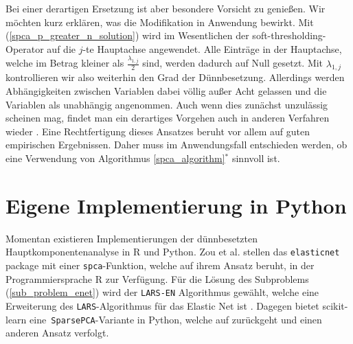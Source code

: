 Bei einer derartigen Ersetzung ist aber besondere Vorsicht zu genießen. Wir möchten kurz erklären, was die Modifikation in Anwendung bewirkt. Mit (\ref{spca_p_greater_n_solution}) wird im Wesentlichen der soft-thresholding-Operator auf die $j$-te Hauptachse angewendet. Alle Einträge in der Hauptachse, welche im Betrag kleiner als $\frac{\lambda_{1,j}}{2}$ sind, werden dadurch auf Null gesetzt. Mit $\lambda_{1,j}$ kontrollieren wir also weiterhin den Grad der Dünnbesetzung. Allerdings werden Abhängigkeiten zwischen Variablen dabei völlig außer Acht gelassen und die Variablen als unabhängig angenommen. Auch wenn dies zunächst unzulässig scheinen mag, findet man ein derartiges Vorgehen auch in anderen Verfahren wieder \cite{tibshirani_diagnosis}. Eine Rechtfertigung dieses Ansatzes beruht vor allem auf guten empirischen Ergebnissen. Daher muss im Anwendungsfall entschieden werden, ob eine Verwendung von Algorithmus \ref{spca_algorithm}$^*$ sinnvoll ist.




\section{Eigene Implementierung in Python}

Momentan existieren Implementierungen der dünnbesetzten Hauptkomponentenanalyse in R und Python. Zou et al. stellen das \texttt{elasticnet} package mit einer \texttt{spca}-Funktion, welche auf ihrem Ansatz beruht, in der Programmiersprache R zur Verfügung. Für die Lösung des Subproblems (\ref{sub_problem_enet}) wird der \texttt{LARS-EN} Algorithmus gewählt, welche eine Erweiterung des \texttt{LARS}-Algorithmus für das Elastic Net ist \cite{zou_elasticnet}. Dagegen bietet scikit-learn eine\texttt{ SparsePCA}-Variante in Python, welche auf \cite{jenatton} zurückgeht und einen anderen Ansatz verfolgt.


